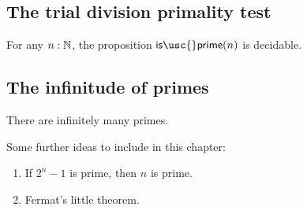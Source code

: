 \subsection{The trial division primality test}

\begin{thm}
  For any $n:{\mathbb{N}}$, the proposition $\mathsf{is\usc{}prime}(n)$ is decidable.
\end{thm}

\subsection{The infinitude of primes}

\begin{thm}
  There are infinitely many primes.
\end{thm}

Some further ideas to include in this chapter:
\begin{enumerate}
\item If $2^n-1$ is prime, then $n$ is prime.
\item Fermat's little theorem.
\end{enumerate}

